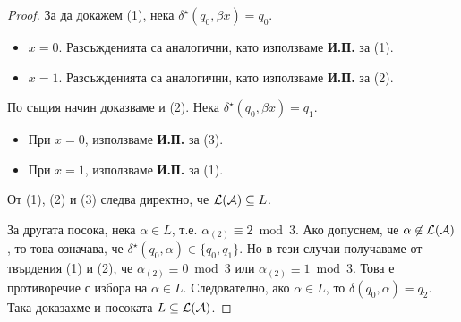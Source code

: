\begin{proof}
  За да докажем (1), нека $\delta^\star(q_0,\beta x) = q_0$. 
  \begin{itemize}
  \item 
    $x = 0$. Разсъжденията са аналогични, като използваме {\bf И.П.} за (1).
  \item
    $x = 1$. Разсъжденията са аналогични, като използваме {\bf И.П.} за (2).
  \end{itemize}
  
  По същия начин доказваме и (2). Нека $\delta^\star(q_0,\beta x) = q_1$. 
  \begin{itemize}
  \item 
    При $x = 0$, използваме {\bf И.П.} за (3).
  \item
    При $x = 1$, използваме {\bf И.П.} за (1).
  \end{itemize}

  От (1), (2) и (3) следва директно, че $\mathcal{L}(\mathcal{A}) \subseteq L$.
  
  За другата посока, нека $\alpha \in L$, т.е. $\alpha_{(2)} \equiv 2 \bmod 3$.
  Ако допуснем, че $\alpha \not\in \mathcal{L}(\mathcal{A})$, то това означава, че $\delta^\star(q_0,\alpha) \in \{q_0,q_1\}$.
  Но в тези случаи получаваме от твърдения (1) и (2), че $\alpha_{(2)} \equiv 0 \bmod 3$ или $\alpha_{(2)} \equiv 1 \bmod 3$.
  Това е противоречие с избора на $\alpha \in L$. Следователно, ако $\alpha \in L$, то $\delta(q_0,\alpha) = q_2$.
  Така доказахме и посоката $L \subseteq \mathcal{L}(\mathcal{A})$.
\end{proof}


